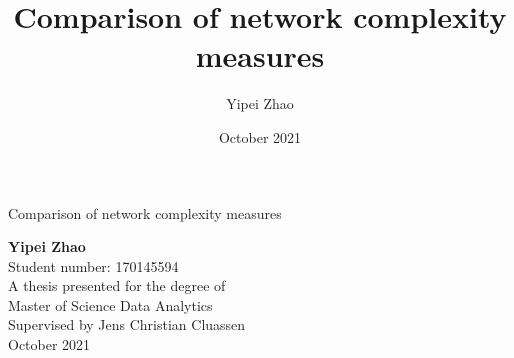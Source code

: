 \documentclass[12pt]{article}
\title{Comparison of network complexity measures}
\author{Yipei Zhao}
\date{October 2021}
\begin{document}
\begin{titlepage}
    \begin{center}
        \vspace*{1cm}
 
        {\Huge Comparison of network complexity measures}
 
        \vspace{0.5cm}
         
             
        \vspace{1.5cm}
 
        \textbf{Yipei Zhao}\\
        Student number: 170145594\\
        A thesis presented for the degree of\\
        Master of Science Data Analytics\\
        {\large Supervised by Jens Christian Cluassen}\\
        October 2021
 
        \vfill
             

    \end{center}
 \end{titlepage}

\tableofcontents
\pagebreak
\renewcommand{\familydefault}{}
\end{document}
